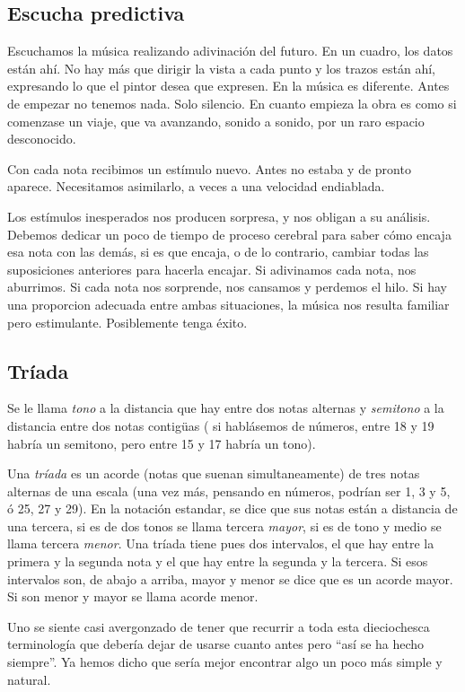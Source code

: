 \documentclass[]{article}
\begin{document}
\subsection{Escucha predictiva}

Escuchamos la música realizando adivinación del futuro. En un cuadro, los datos están ahí. No hay más que dirigir la vista a cada punto y los trazos están ahí, expresando lo que el pintor desea que expresen. En la música es diferente. Antes de empezar no tenemos nada. Solo silencio. En cuanto empieza la obra es como si comenzase un viaje, que va avanzando, sonido a sonido, por un raro espacio desconocido.

Con cada nota recibimos un estímulo nuevo. Antes no estaba y de pronto aparece. Necesitamos asimilarlo, a veces a una velocidad endiablada.

Los estímulos inesperados nos producen sorpresa, y nos obligan a su análisis. Debemos dedicar un poco de tiempo de proceso cerebral para saber cómo encaja esa nota con las demás, si es que encaja, o de lo contrario, cambiar todas las suposiciones anteriores para hacerla encajar. Si adivinamos cada nota, nos aburrimos. Si cada nota nos sorprende, nos cansamos y perdemos el hilo. Si hay una proporcion adecuada entre ambas situaciones, la música nos resulta familiar pero estimulante. Posiblemente tenga éxito.

\subsection{Tríada}

Se le llama \emph{tono} a la distancia que hay entre dos notas alternas y \emph{semitono} a la distancia entre dos notas contigüas ( si hablásemos de números, entre 18 y 19 habría un semitono, pero entre 15 y 17 habría un tono).

Una \emph{tríada} es un acorde (notas que suenan simultaneamente) de tres notas alternas de una escala (una vez más, pensando en números, podrían ser 1, 3 y 5, ó 25, 27 y 29). En la notación estandar, se dice que sus notas están a distancia de una tercera, si es de dos tonos se llama tercera \emph{mayor}, si es de tono y medio se llama tercera \emph{menor}. Una tríada tiene pues dos intervalos, el que hay entre la primera y la segunda nota y el que hay entre la segunda y la tercera. Si esos intervalos son, de abajo a arriba, mayor y menor se dice que es un acorde mayor. Si son menor y mayor se llama acorde menor.

Uno se siente casi avergonzado de tener que recurrir a toda esta dieciochesca terminología que debería dejar de usarse cuanto antes pero ``así se ha hecho siempre''. Ya hemos dicho que sería mejor encontrar algo un poco más simple y natural.
\end{document}
